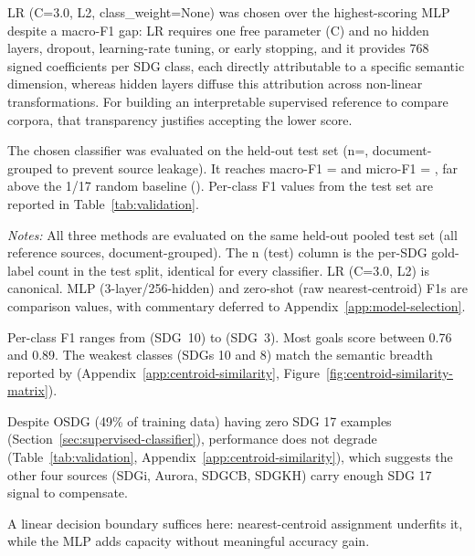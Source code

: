 \documentclass[12pt,a4paper]{article}
\begin{document}
LR (C=3.0, L2, class\_weight=None) was chosen over the highest-scoring MLP despite a \LrMlpGap{} macro-F1 gap: LR requires one free parameter (C) and no hidden layers, dropout, learning-rate tuning, or early stopping, and it provides 768 signed coefficients per SDG class, each directly attributable to a specific semantic dimension, whereas hidden layers diffuse this attribution across non-linear transformations. For building an interpretable supervised reference to compare corpora, that transparency justifies accepting the lower score.

The chosen classifier was evaluated on the held-out test set (n=\NTestPool{}, document-grouped to prevent source leakage). It reaches macro-F1 = \MacroFOne{} and micro-F1 = \ValidationAccuracy{}, far above the 1/17 random baseline (\RandomBaselineSeventeenClass). Per-class F1 values from the test set are reported in Table~\ref{tab:validation}.

\begin{table}[ht]
\centering
\footnotesize
\caption{LR, MLP, and zero-shot (nearest-centroid) test-set F1 scores (n=\NTestPool{}).}
\label{tab:validation}

\par\smallskip\footnotesize\emph{Notes:} All three methods are evaluated on the same held-out pooled test set (all reference sources, document-grouped). The n (test) column is the per-SDG gold-label count in the test split, identical for every classifier. LR (C=3.0, L2) is canonical. MLP (3-layer/256-hidden) and zero-shot (raw nearest-centroid) F1s are comparison values, with commentary deferred to Appendix~\ref{app:model-selection}.\par
\end{table}

Per-class F1 ranges from \FiSdgTen{} (SDG~10) to \FiSdgThree{} (SDG~3). Most goals score between 0.76 and 0.89. The weakest classes (SDGs 10 and 8) match the semantic breadth reported by \textcite{Kashnitsky2024} (Appendix~\ref{app:centroid-similarity}, Figure~\ref{fig:centroid-similarity-matrix}).

Despite OSDG (49\% of training data) having zero SDG 17 examples (Section~\ref{sec:supervised-classifier}), performance does not degrade (Table~\ref{tab:validation}, Appendix~\ref{app:centroid-similarity}), which suggests the other four sources (SDGi, Aurora, SDGCB, SDGKH) carry enough SDG 17 signal to compensate.

A linear decision boundary suffices here: nearest-centroid assignment underfits it, while the MLP adds capacity without meaningful accuracy gain.
\end{document}
